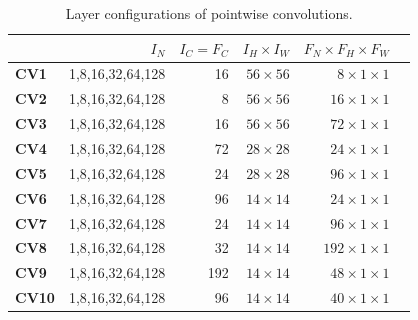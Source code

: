 \begin{table}[]
\setlength{\tabcolsep}{5.2pt}
\caption{Layer configurations of pointwise convolutions.}
\label{tab:pwconv}
\begin{threeparttable}
\begin{tabular}{lrrrrr}
\toprule
& \textbf{$I_N$} & \textbf{$I_C=F_C$} & \textbf{$I_H \times I_W$} & \textbf{$F_N \times F_H \times F_W$} \\
\midrule
\textbf{CV1}  & 1,8,16,32,64,128  & 16    & $56\times 56$   & $8 \times 1\times 1$\\
\textbf{CV2}  & 1,8,16,32,64,128  & 8     & $56\times 56$   & $16 \times 1\times 1$\\
\textbf{CV3}  & 1,8,16,32,64,128  & 16    & $56\times 56$   & $72 \times 1\times 1$\\
\textbf{CV4}  & 1,8,16,32,64,128  & 72    & $28\times 28$   & $24 \times 1\times 1$\\
\textbf{CV5}  & 1,8,16,32,64,128  & 24    & $28\times 28$   & $96 \times 1\times 1$\\
\textbf{CV6}  & 1,8,16,32,64,128  & 96    & $14\times 14$   & $24 \times 1\times 1$\\
\textbf{CV7} & 1,8,16,32,64,128  & 24    & $14\times 14$   & $96  \times 1\times 1$\\
\textbf{CV8} & 1,8,16,32,64,128  & 32    & $14\times 14$   & $192 \times 1\times 1$\\
\textbf{CV9} & 1,8,16,32,64,128  & 192   & $14\times 14$   & $48  \times 1\times 1$\\
\textbf{CV10} & 1,8,16,32,64,128  & 96    & $14\times 14$   & $40 \times 1\times 1$\\

\end{tabular}
\end{threeparttable}
\end{table}
